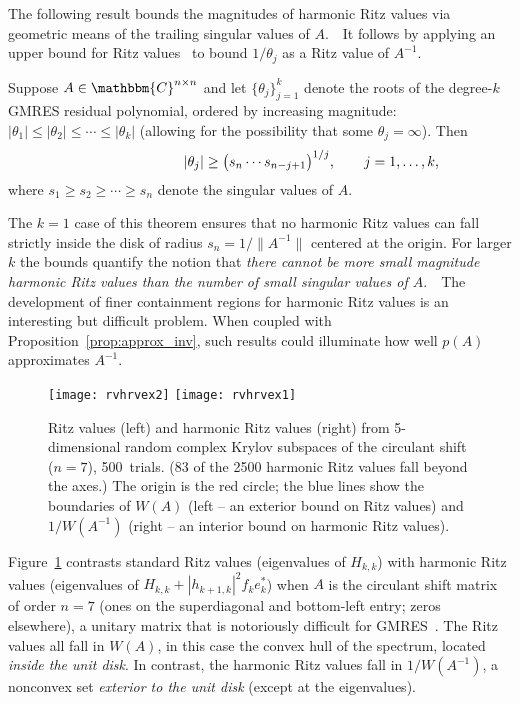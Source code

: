 \documentclass{siamart}
\def\C{\mathbbm{C}}
\begin{document}
The following result bounds the magnitudes of  harmonic Ritz values via geometric means of the trailing singular values of $A$.\ \ It follows by applying an upper bound for Ritz values~\cite[Theorem~2.3]{CE12} to bound $1/\theta_j$ as a Ritz value of $A^{-1}$.
\begin{theorem}
Suppose $A\in\C^{n\times n}$ and let $\{\theta_j\}_{j=1}^k$ denote the roots of the degree-$k$ GMRES residual polynomial, ordered by increasing magnitude: $|\theta_1| \le |\theta_2| \le \cdots \le |\theta_k|$ (allowing for the possibility that some $\theta_j = \infty$).  Then
\[ |\theta_j| \ge \big(s_n \cdots s_{n-j+1}\big)^{1/j}, \rlap{\qquad $j = 1,\ldots, k,$}\]
where $s_1 \ge s_2 \ge \cdots \ge s_n$ denote the singular values of $A$.
\end{theorem}
 The $k=1$ case of this theorem ensures that no harmonic Ritz values can fall strictly inside the disk of radius $s_n = 1/\|A^{-1}\|$ centered at the origin.  For larger $k$ the bounds quantify the notion that \emph{there cannot be more small magnitude harmonic Ritz values than the number of small singular values of $A$}.\ \ The development of finer containment regions for harmonic Ritz values is an interesting but difficult problem.  When coupled with Proposition~\ref{prop:approx_inv}, such results could illuminate how well  $p(A)$  approximates $A^{-1}$.

\begin{figure}[t!]
\begin{center}
\texttt{[image: rvhrvex2]}\qquad
\texttt{[image: rvhrvex1]}
\end{center}
\vspace*{-5pt}
\caption{\label{fig:rvhrvex}
Ritz values (left) and harmonic Ritz values (right) 
from 5-dimensional random complex Krylov subspaces of the circulant shift ($n=7$),  500~trials.  (83 of the 2500 harmonic Ritz values fall beyond the axes.)  The origin is the red circle; the blue lines show the boundaries of $W(A)$ (left -- an exterior bound on Ritz values) and $1/W(A^{-1})$ (right -- an interior bound on harmonic Ritz values).  }
\end{figure}

Figure~\ref{fig:rvhrvex} contrasts standard Ritz values (eigenvalues of $H_{k,k}$) with harmonic Ritz values (eigenvalues of $H_{k,k} + |h_{k+1,k}|^2 f_k^{} e_k^*$) when $A$ is the circulant shift matrix of order $n=7$ (ones on the superdiagonal and bottom-left entry; zeros elsewhere), a unitary matrix that is notoriously difficult for GMRES~\cite{Bro91}.  The Ritz values all fall in $W(A)$, in this case the convex hull of the spectrum, located 
\emph{inside the unit disk}.  In contrast, the harmonic Ritz values fall in $1/W(A^{-1})$, a nonconvex set \emph{exterior to the unit disk} (except at the eigenvalues).
\end{document}
